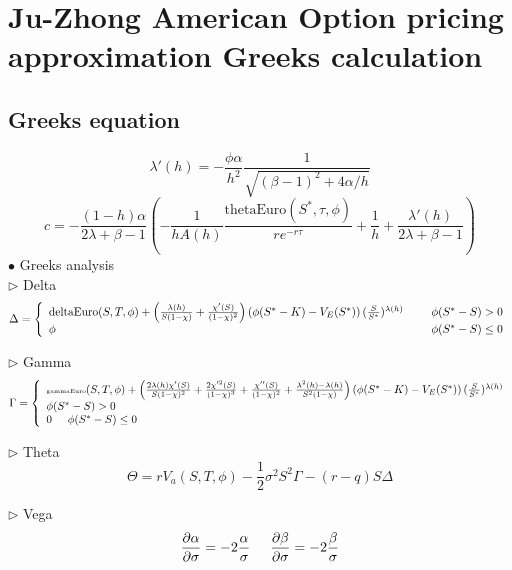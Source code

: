 \documentclass[preprint,12pt,1p]{elsarticle}
\begin{document}
\section{Ju-Zhong American Option pricing approximation Greeks calculation}
\label{appendix-sec2}
\subsection{Greeks equation}
\begin{spacing}{1.3}
$$ \lambda'(h) = - \frac{\phi \alpha}{h^2} \frac{1}{\sqrt{(\beta-1)^2 + 4\alpha/h}}$$
$$ c = - \frac{(1-h)\alpha}{2\lambda + \beta -1} \left(-\frac{1}{hA(h)} \frac{\text{thetaEuro}(S^*, \tau, \phi)}{re^{-r\tau}} + \frac{1}{h} + \frac{\lambda'(h)}{2\lambda + \beta -1}\right)$$
$\bullet$ 
Greeks analysis\\
$\rhd$ Delta\\
\[   \Delta = \left\{ 
\begin{array}{ll}
      \text{deltaEuro}(S, T, \phi) + \left(\frac{\lambda(h)}{S(1-\chi)}  + \frac{\chi'(S)}{(1-\chi)^2}  \right) \left(\phi(S^*-K) - V_E(S^*)\right) (\frac{S}{S^*})^{\lambda(h)} & \hspace{0.5cm}  \phi(S^* - S) > 0\\
      \phi & \hspace{0.5cm}  \phi(S^* - S) \leq 0\\
\end{array} 
\right. \]

$\rhd$ Gamma\\
\[   \Gamma= \left\{ 
\begin{array}{ll}
\begin{tiny}
      \text{gammaEuro}(S, T, \phi) + \left( \frac{2\lambda(h)\chi'(S)}{S(1-\chi)^2} + \frac{2\chi'^2(S)}{(1-\chi)^3} + \frac{\chi''(S)}{(1-\chi)^2} + \frac{\lambda^2(h) - \lambda(h)}{S^2(1-\chi)} \right) \left(\phi(S^*-K) - V_E(S^*)\right) (\frac{S}{S^*})^{\lambda(h)}  \end{tiny} \\
       \phi(S^* - S) > 0\\
      0  \hspace{0.5cm}  \phi(S^* - S) \leq 0\\
\end{array} 
\right. \]

$\rhd$ Theta\\
$$\Theta = rV_a(S, T, \phi)  - \frac{1}{2}\sigma^2 S^2 \Gamma - (r-q)S\Delta$$

$\rhd$ Vega\\
$$\frac{\partial \alpha}{\partial \sigma} = -2 \frac{\alpha}{\sigma} \hspace{0.5cm} \frac{\partial \beta}{\partial \sigma} = -2 \frac{\beta}{\sigma}$$


\end{spacing}
\end{document}
